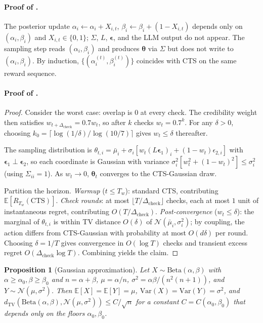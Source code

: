 \documentclass{article}
\theoremstyle{plain}
\newtheorem{proposition}[theorem]{Proposition}
\theoremstyle{definition}
\theoremstyle{remark}
\newcommand{\E}{\mathbb{E}}
\begin{document}
\paragraph{Proof of .}
The posterior update $\alpha_i \gets \alpha_i + X_{i,t}$, $\beta_i \gets \beta_i + (1 - X_{i,t})$ depends only on $(\alpha_i, \beta_i)$ and $X_{i,t} \in \{0,1\}$; $\Sigma$, $L$, $\boldsymbol{\epsilon}$, and the LLM output do not appear.
The sampling step reads $(\alpha_i, \beta_i)$ and produces $\boldsymbol{\theta}$ via $\Sigma$ but does not write to $(\alpha_i, \beta_i)$.
By induction, $\{(\alpha_i^{(t)}, \beta_i^{(t)})\}$ coincides with CTS on the same reward sequence.

\paragraph{Proof of .}

\begin{proof}
Consider the worst case: overlap is $0$ at every check.
The credibility weight then satisfies $w_{t + \Delta_{\text{check}}} = 0.7 w_t$, so after $k$ checks $w_t = 0.7^k$.
For any $\delta > 0$, choosing $k_0 = \lceil \log(1/\delta) / \log(10/7) \rceil$ gives $w_t \leq \delta$ thereafter.

The sampling distribution is $\theta_{t,i} = \bar\mu_i + \sigma_i [w_t (L\boldsymbol{\epsilon}_1)_i + (1-w_t)\epsilon_{2,i}]$ with $\boldsymbol{\epsilon}_1 \perp \boldsymbol{\epsilon}_2$, so each coordinate is Gaussian with variance $\sigma_i^2 [w_t^2 + (1-w_t)^2] \leq \sigma_i^2$ (using $\Sigma_{ii} = 1$).
As $w_t \to 0$, $\boldsymbol{\theta}_t$ converges to the CTS-Gaussian draw.

Partition the horizon.
\emph{Warmup} ($t \leq T_w$): standard CTS, contributing $\E[R_{T_w}(\text{CTS})]$.
\emph{Check rounds}: at most $\lfloor T / \Delta_{\text{check}} \rfloor$ checks, each at most $1$ unit of instantaneous regret, contributing $O(T / \Delta_{\text{check}})$.
\emph{Post-convergence} ($w_t \leq \delta$): the marginal of $\theta_{t,i}$ is within TV distance $O(\delta)$ of $\mathcal{N}(\bar\mu_i, \sigma_i^2)$; by coupling, the action differs from CTS-Gaussian with probability at most $O(d\delta)$ per round.
Choosing $\delta = 1/T$ gives convergence in $O(\log T)$ checks and transient excess regret $O(\Delta_{\text{check}} \log T)$.
Combining yields the claim.
\end{proof}

\begin{proposition}[Gaussian approximation]\label{prop:gaussian}
Let $X \sim \mathrm{Beta}(\alpha, \beta)$ with $\alpha \geq \alpha_0, \beta \geq \beta_0$ and $n = \alpha + \beta$, $\mu = \alpha/n$, $\sigma^2 = \alpha\beta / (n^2(n+1))$, and $Y \sim \mathcal{N}(\mu, \sigma^2)$.
Then $\E[X] = \E[Y] = \mu$, $\mathrm{Var}(X) = \mathrm{Var}(Y) = \sigma^2$, and
$d_{\mathrm{TV}}(\mathrm{Beta}(\alpha,\beta), \mathcal{N}(\mu, \sigma^2)) \leq C/\sqrt{n}$
for a constant $C = C(\alpha_0, \beta_0)$ that depends only on the floors $\alpha_0, \beta_0$.
\end{proposition}
\end{document}
